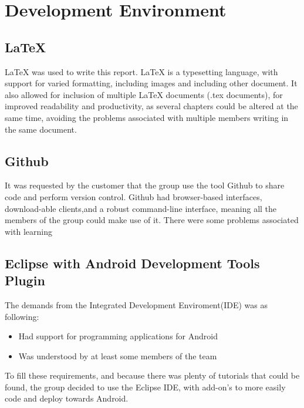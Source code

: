 \chapter{Development Environment}

\section{LaTeX}
LaTeX was used to write this report. LaTeX is a typesetting language, with support for varied formatting, including images and including other document. It also allowed for inclusion of multiple LaTeX documents (.tex documents), for improved readability and productivity, as several chapters could be altered at the same time, avoiding the problems associated with multiple members writing in the same document.
\section{Github}
It was requested by the customer that the group use the tool Github to share code and perform version control. Github had browser-based interfaces, download-able clients,and a robust command-line interface, meaning all the members of the group could make use of it. There were some problems associated with learning

\section{Eclipse with Android Development Tools Plugin}
The demands from the Integrated Development Enviroment(IDE) was as following:
\begin{itemize}
\item Had support for programming applications for Android
\item Was understood by at least some members of the team
\end{itemize}
To fill these requirements, and because there was plenty of tutorials that could be found, the group decided to use the Eclipse IDE, with add-on's to more easily code and deploy towards Android. 


 